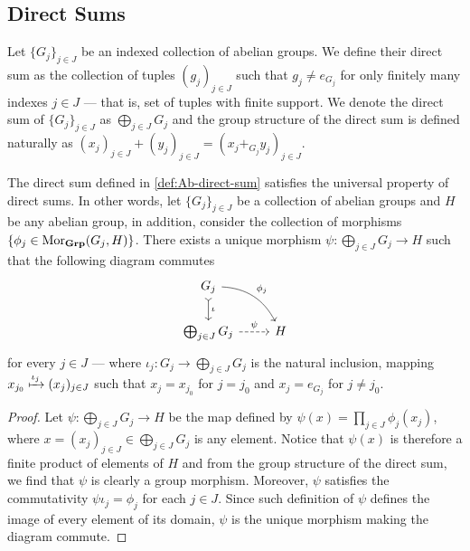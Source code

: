\subsection{Direct Sums}

\begin{definition}
\label{def:Ab-direct-sum}
Let \(\{G_j\}_{j \in J}\) be an indexed collection of abelian groups. We define
their direct sum as the collection of tuples \((g_j)_{j \in J}\) such that \(g_j
\neq e_{G_j}\) for only finitely many indexes \(j \in J\) --- that is, set of
tuples with finite support. We denote the direct sum of \(\{G_{j}\}_{j \in J}\)
as \(\bigoplus_{j \in J} G_j\) and the group structure of the direct sum is
defined naturally as \((x_j)_{j \in J} + (y_j)_{j \in J} = (x_j +_{G_{j}}
y_j)_{j \in J}\).
\end{definition}

\begin{proposition}
\label{prop:Ab-direct-sum-universal-property}
The direct sum defined in \cref{def:Ab-direct-sum} satisfies the universal
property of direct sums. In other words, let \(\{G_{j}\}_{j \in J}\) be a
collection of abelian groups and \(H\) be any abelian group, in addition,
consider the collection of morphisms \(\{\phi_j \in \operatorname{Mor}_{{\textbf{Grp}}}(G_j,
H)\}\). There exists a unique morphism \(\psi: \bigoplus_{j \in J} G_j \to H\)
such that the following diagram commutes
\[
  \begin{tikzcd}
    G_j \ar[rd, bend left, "\phi_j"] \ar[d, tail, "\iota"] &\\
    \bigoplus_{j \in J} G_j \ar[r, dashed, "\psi"] &H
  \end{tikzcd}
\]
for every \(j \in J\) --- where \(\iota_{j}: G_j \to \bigoplus_{j \in J} G_j\)
is the natural inclusion, mapping \(x_{j_0} \xmapsto{\iota_{j}} (x_j)_{j \in
J}\) such that \(x_j = x_{j_0}\) for \(j = j_0\) and \(x_j = e_{G_j}\) for \(j
\neq j_0\).
\end{proposition}

\begin{proof}
Let \(\psi: \bigoplus_{j \in J} G_j \to H\) be the map defined by \(\psi(x) =
\prod_{j \in J} \phi_{j}(x_j)\), where \(x = (x_j)_{j \in J} \in \bigoplus_{j
\in J} G_j\) is any element. Notice that \(\psi(x)\) is therefore a finite
product of elements of \(H\) and from the group structure of the direct sum, we
find that \(\psi\) is clearly a group morphism. Moreover, \(\psi\) satisfies the
commutativity \(\psi \iota_j = \phi_j\) for each \(j \in J\). Since such
definition of \(\psi\) defines the image of every element of its domain,
\(\psi\) is the unique morphism making the diagram commute.
\end{proof}

